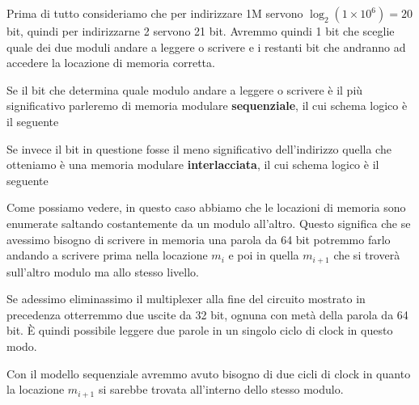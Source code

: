 Prima di tutto consideriamo che per indirizzare 1M servono $\log_2 (1 \times 10^6) = 20$ bit,
quindi per indirizzarne 2 servono 21 bit. Avremmo quindi 1 bit che sceglie quale dei due moduli
andare a leggere o scrivere e i restanti bit che andranno ad accedere la locazione di memoria
corretta.


Se il bit che determina quale modulo andare a leggere o scrivere è il più significativo parleremo
di memoria modulare \textbf{sequenziale}, il cui schema logico è il seguente
\begin{center}
\end{center}
Se invece il bit in questione fosse il meno significativo dell'indirizzo quella che otteniamo è una
memoria modulare \textbf{interlacciata}, il cui schema logico è il seguente
\begin{center}
\end{center}
Come possiamo vedere, in questo caso abbiamo che le locazioni di memoria sono enumerate saltando
costantemente da un modulo all'altro. Questo significa che se avessimo bisogno di scrivere in
memoria una parola da 64 bit potremmo farlo andando a scrivere prima nella locazione $m_i$ e poi in
quella $m_{i+1}$ che si troverà sull'altro modulo ma allo stesso livello.

Se adessimo eliminassimo il multiplexer alla fine del circuito mostrato in precedenza otterremmo
due uscite da 32 bit, ognuna con metà della parola da 64 bit. \`E quindi possibile leggere due
parole in un singolo ciclo di clock in questo modo.

Con il modello sequenziale avremmo avuto bisogno di due cicli di clock in quanto la locazione
$m_{i+1}$ si sarebbe trovata all'interno dello stesso modulo.
